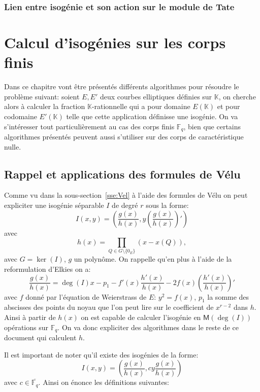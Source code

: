 \documentclass[10pt,a4paper]{book}
\theoremstyle{plain}
\theoremstyle{definition}
\theoremstyle{definition}
\theoremstyle{definition}
\theoremstyle{definition}
\theoremstyle{remark}
\theoremstyle{remark}
\theoremstyle{definition}
\begin{document}
\subsection{Lien entre isogénie et son action sur le module de Tate}

\chapter{Calcul d'isogénies sur les corps finis}
Dans ce chapitre vont être présentés différents algorithmes pour résoudre le problème suivant: soient $E, E'$ deux courbes elliptiques définies sur $\mathbb{K}$, on cherche alors à calculer la fraction $\mathbb{K}$-rationnelle qui a pour domaine $E(\mathbb{K})$ et pour codomaine $E'(\mathbb{K})$  telle que  cette application  définisse une isogénie.
On va s'intéresser tout particulièrement au cas des corps finis $\mathbb{F}_q$, bien que certains algorithmes présentés peuvent aussi s'utiliser sur des corps de caractéristique nulle.

\section{Rappel et applications des formules de Vélu}
Comme vu dans la sous-section~\ref{sse:Vel} à l'aide des formules de Vélu on peut expliciter une isogénie séparable $I$ de degré $r$ sous la forme:
\begin{equation} 
I(x,y)=\left(\frac{g(x)}{h(x)},y\left( \frac{g(x)}{h(x)} \right)'\right)
\end{equation}
avec 
\begin{equation*}
h(x)=\prod_{Q \in G \setminus \{0_E\}}(x-x(Q)),
\end{equation*}
avec $G=\ker(I)$, $g$ un polynôme. On rappelle qu'en plus à l'aide de la reformulation d'Elkies on a:
\begin{equation}
\label{eq:vel:elk}
\frac{g(x)}{h(x)}= \deg(I) x -p_1 - f'(x) \frac{h'(x)}{h(x)} -2f(x)  \left(\frac{h'(x)}{h(x)}\right)'
\end{equation}
avec $f$ donné par l'équation de Weierstrass de $E$: $y^2=f(x)$, $p_1$ la somme des abscisses des points du noyau que l'on peut lire sur le coefficient de $x^{r-2}$ dans $h$. Ainsi à partir de $h(x)$ on est capable de calculer l'isogénie en $\mathsf{M}(\deg(I))$ opérations sur $\mathbb{F}_q$. On va donc expliciter des algorithmes dans le reste de ce document qui calculent $h$.


Il est important de noter qu'il existe des isogénies de la forme:
\begin{equation}
\label{eq:iso:gen}
I(x,y)=\left( \frac{g(x)}{h(x)},cy\frac{g(x)}{h(x)} \right)
\end{equation}
avec $c \in \overline{\mathbb{F}_q}$. Ainsi on énonce les définitions suivantes:
\end{document}
